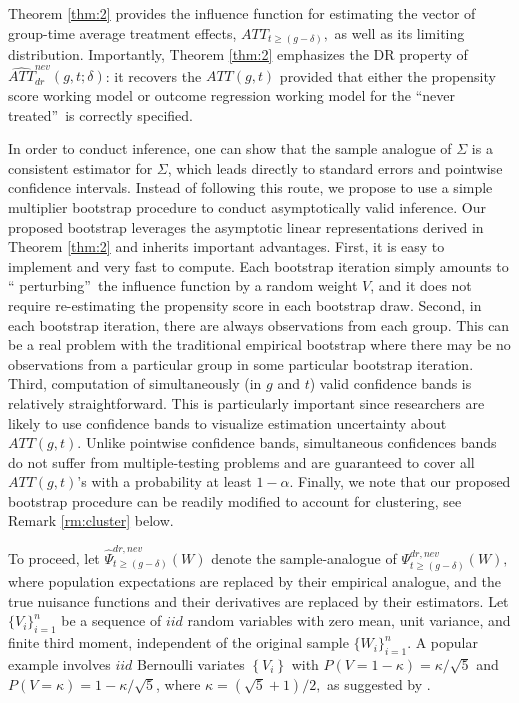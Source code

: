 \documentclass[11pt]{article}%
\theoremstyle{plain}
\numberwithin{sassumption}{section}
\numberwithin{equation}{section}
\begin{document}
Theorem \ref{thm:2} provides the influence function for estimating the vector
of group-time average treatment effects, $ATT_{t\geq\left(  g-\delta\right)
},$ as well as its limiting distribution. Importantly, Theorem \ref{thm:2}
emphasizes the DR property of $\widehat{ATT}_{dr}^{nev}\left(  g,t;\delta
\right)  $: it recovers the $ATT\left(  g,t\right)  $ provided that either the
propensity score working model or outcome regression working model for the
\textquotedblleft never treated\textquotedblright\ is correctly specified.

In order to conduct inference, one can show that the sample analogue of
$\Sigma$ is a consistent estimator for $\Sigma$, which leads directly to
standard errors and pointwise confidence intervals. Instead of following this
route, we propose to use a simple multiplier bootstrap procedure to conduct
asymptotically valid inference. Our proposed bootstrap leverages the
asymptotic linear representations derived in Theorem \ref{thm:2} and inherits
important advantages. First, it is easy to implement and very fast to compute.
Each bootstrap iteration simply amounts to \textquotedblleft
perturbing\textquotedblright\ the influence function by a random weight $V$,
and it does not require re-estimating the propensity score in each bootstrap
draw. Second, in each bootstrap iteration, there are always observations from
each group. This can be a real problem with the traditional empirical
bootstrap where there may be no observations from a particular group in some
particular bootstrap iteration. Third, computation of simultaneously (in $g$
and $t$) valid confidence bands is relatively straightforward. This is
particularly important since researchers are likely to use confidence bands to
visualize estimation uncertainty about $ATT\left(  g,t\right)  .$ Unlike
pointwise confidence bands, simultaneous confidences bands do not suffer from
multiple-testing problems and are guaranteed to cover all $ATT\left(
g,t\right)$'s with a probability at least $1-\alpha$. Finally, we note that
our proposed bootstrap procedure can be readily modified to account for
clustering, see Remark \ref{rm:cluster} below.

To proceed, let $\widehat{\Psi}_{t\geq\left(  g-\delta\right)  }^{dr,nev}(W)$
denote the sample-analogue of $\Psi_{t\geq\left(  g-\delta\right)  }%
^{dr,nev}(W),$ where population expectations are replaced by their empirical
analogue, and the true nuisance functions and their derivatives are replaced
by their estimators. Let $\{V_{i}\}_{i=1}^{n}$ be a sequence of $iid$ random
variables with zero mean, unit variance, and finite third moment, independent
of the original sample $\{W_{i}\}_{i=1}^{n}$. A popular example involves $iid$
Bernoulli variates $\left\{  V_{i}\right\}  $ with $P\left(  V=1-\kappa
\right)  =\kappa/\sqrt{5}$ and $P\left(  V=\kappa\right)  =1-\kappa/\sqrt{5}$,
where $\kappa=\left(  \sqrt{5}+1\right)  /2,$ as suggested by
\cite{Mammen1993}.
\end{document}

